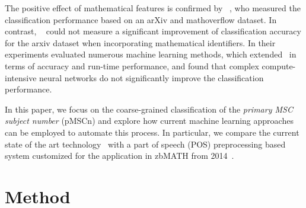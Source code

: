 The positive effect of mathematical features is confirmed by \citeauthor{SuzukiF17}~\cite{SuzukiF17}, who measured the classification performance based on an arXiv and mathoverflow dataset.
In contrast, \citeauthor{Scharpf2020}~\cite{Scharpf2020} could not measure a significant improvement of classification accuracy for the arxiv dataset when incorporating mathematical identifiers.
In their experiments \citeauthor{Scharpf2020} evaluated numerous machine learning methods, which extended~\cite{Evans17,SojkaNALS19} in terms of accuracy and run-time performance, and found that complex compute-intensive neural networks do not significantly improve the classification performance.

In this paper, we focus on the coarse-grained classification of the \emph{primary MSC subject number} (pMSCn) and explore how current machine learning approaches can be employed to automate this process.
In particular, we compare the current state of the art technology~\cite{Scharpf2020} with a part of speech (POS) preprocessing based system customized for the application in zbMATH from 2014~\cite{SchonebergS14}.
\\

\noindent\hspace{-.01\textwidth}

\section{Method}\label{sec:method}


